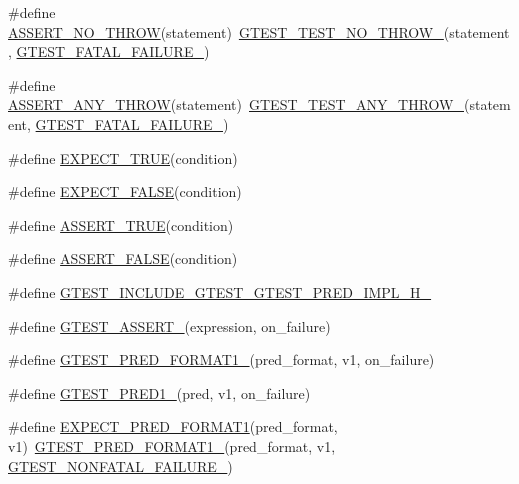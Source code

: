 \begin{DoxyCompactItemize}
\#define \hyperlink{fused-src_2gtest_2gtest_8h_a895c34d9b192cdc2ba46d2680623485d}{A\-S\-S\-E\-R\-T\-\_\-\-N\-O\-\_\-\-T\-H\-R\-O\-W}(statement)~\hyperlink{gtest-internal_8h_a9a109d026b5a904646437d7570e13581}{G\-T\-E\-S\-T\-\_\-\-T\-E\-S\-T\-\_\-\-N\-O\-\_\-\-T\-H\-R\-O\-W\-\_\-}(statement, \hyperlink{gtest-internal_8h_a0f9a4c3ea82cc7bf4478eaffdc168358}{G\-T\-E\-S\-T\-\_\-\-F\-A\-T\-A\-L\-\_\-\-F\-A\-I\-L\-U\-R\-E\-\_\-})
\item 
\#define \hyperlink{fused-src_2gtest_2gtest_8h_affadeef9379fe5aabf6f28d9eab9d3c0}{A\-S\-S\-E\-R\-T\-\_\-\-A\-N\-Y\-\_\-\-T\-H\-R\-O\-W}(statement)~\hyperlink{gtest-internal_8h_af48bbd26d54d4afc5e4cef39b1c76ba3}{G\-T\-E\-S\-T\-\_\-\-T\-E\-S\-T\-\_\-\-A\-N\-Y\-\_\-\-T\-H\-R\-O\-W\-\_\-}(statement, \hyperlink{gtest-internal_8h_a0f9a4c3ea82cc7bf4478eaffdc168358}{G\-T\-E\-S\-T\-\_\-\-F\-A\-T\-A\-L\-\_\-\-F\-A\-I\-L\-U\-R\-E\-\_\-})
\item 
\#define \hyperlink{fused-src_2gtest_2gtest_8h_ac33e7cdfb5d44a7a0f0ab552eb5c3c6a}{E\-X\-P\-E\-C\-T\-\_\-\-T\-R\-U\-E}(condition)
\item 
\#define \hyperlink{fused-src_2gtest_2gtest_8h_aeb6c7ae89f440c90c1a1815951c836da}{E\-X\-P\-E\-C\-T\-\_\-\-F\-A\-L\-S\-E}(condition)
\item 
\#define \hyperlink{fused-src_2gtest_2gtest_8h_ae9244bfbda562e8b798789b001993fa5}{A\-S\-S\-E\-R\-T\-\_\-\-T\-R\-U\-E}(condition)
\item 
\#define \hyperlink{fused-src_2gtest_2gtest_8h_a8197fa52f3538588d20d8af4834c9003}{A\-S\-S\-E\-R\-T\-\_\-\-F\-A\-L\-S\-E}(condition)
\item 
\#define \hyperlink{fused-src_2gtest_2gtest_8h_a36afb7e44e600d2da0e6d8f4f739ea3b}{G\-T\-E\-S\-T\-\_\-\-I\-N\-C\-L\-U\-D\-E\-\_\-\-G\-T\-E\-S\-T\-\_\-\-G\-T\-E\-S\-T\-\_\-\-P\-R\-E\-D\-\_\-\-I\-M\-P\-L\-\_\-\-H\-\_\-}
\item 
\#define \hyperlink{fused-src_2gtest_2gtest_8h_a8c09939dd67f1bb5b68c9f6a44ea75db}{G\-T\-E\-S\-T\-\_\-\-A\-S\-S\-E\-R\-T\-\_\-}(expression, on\-\_\-failure)
\item 
\#define \hyperlink{fused-src_2gtest_2gtest_8h_aa3e3bfe04bb0e54d7f0e57e2f991d1eb}{G\-T\-E\-S\-T\-\_\-\-P\-R\-E\-D\-\_\-\-F\-O\-R\-M\-A\-T1\-\_\-}(pred\-\_\-format, v1, on\-\_\-failure)
\item 
\#define \hyperlink{fused-src_2gtest_2gtest_8h_ad44cf322952076d85305bbdf39769ac1}{G\-T\-E\-S\-T\-\_\-\-P\-R\-E\-D1\-\_\-}(pred, v1, on\-\_\-failure)
\item 
\#define \hyperlink{fused-src_2gtest_2gtest_8h_a07132aa62cf4902e50e68d0265f573b6}{E\-X\-P\-E\-C\-T\-\_\-\-P\-R\-E\-D\-\_\-\-F\-O\-R\-M\-A\-T1}(pred\-\_\-format, v1)~\hyperlink{gtest__pred__impl_8h_aa3e3bfe04bb0e54d7f0e57e2f991d1eb}{G\-T\-E\-S\-T\-\_\-\-P\-R\-E\-D\-\_\-\-F\-O\-R\-M\-A\-T1\-\_\-}(pred\-\_\-format, v1, \hyperlink{gtest-internal_8h_a6cb7482cfa03661a91c698eb5895f642}{G\-T\-E\-S\-T\-\_\-\-N\-O\-N\-F\-A\-T\-A\-L\-\_\-\-F\-A\-I\-L\-U\-R\-E\-\_\-})

\end{DoxyCompactItemize}
